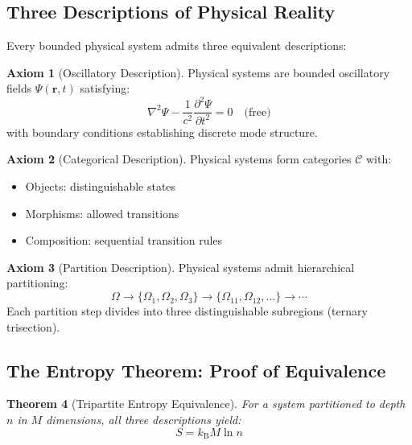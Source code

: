 \documentclass[twocolumn,10pt]{article}
\newtheorem{theorem}{Theorem}[section]
\theoremstyle{definition}
\newtheorem{axiom}[theorem]{Axiom}
\theoremstyle{remark}
\newcommand{\kB}{k_{\mathrm{B}}}
\begin{document}
\subsection{Three Descriptions of Physical Reality}

Every bounded physical system admits three equivalent descriptions:

\begin{axiom}[Oscillatory Description]
\label{ax:osc}
Physical systems are bounded oscillatory fields $\Psi(\mathbf{r}, t)$ satisfying:
\begin{equation}
\nabla^2 \Psi - \frac{1}{c^2}\frac{\partial^2 \Psi}{\partial t^2} = 0 \quad \text{(free)}
\end{equation}
with boundary conditions establishing discrete mode structure.
\end{axiom}

\begin{axiom}[Categorical Description]
\label{ax:cat}
Physical systems form categories $\mathcal{C}$ with:
\begin{itemize}
    \item Objects: distinguishable states
    \item Morphisms: allowed transitions
    \item Composition: sequential transition rules
\end{itemize}
\end{axiom}

\begin{axiom}[Partition Description]
\label{ax:part}
Physical systems admit hierarchical partitioning:
\begin{equation}
\Omega \to \{\Omega_1, \Omega_2, \Omega_3\} \to \{\Omega_{11}, \Omega_{12}, \ldots\} \to \cdots
\end{equation}
Each partition step divides into three distinguishable subregions (ternary trisection).
\end{axiom}

\subsection{The Entropy Theorem: Proof of Equivalence}

\begin{theorem}[Tripartite Entropy Equivalence]
\label{thm:entropy}
For a system partitioned to depth $n$ in $M$ dimensions, all three descriptions yield:
\begin{equation}
S = \kB M \ln n
\end{equation}
\end{theorem}
\end{document}
